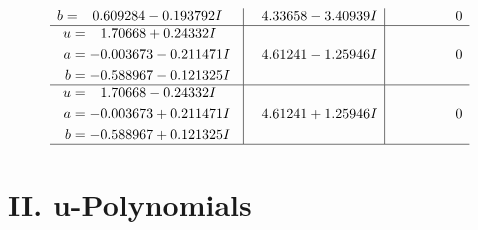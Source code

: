 \documentclass[1p]{elsarticle_modified}
\theoremstyle{definition}
\begin{document}
$$\begin{array}{c|c|c}
\begin{aligned}
b &= \phantom{-}0.609284 - 0.193792 I\end{aligned}
 & \phantom{-}4.33658 - 3.40939 I & \phantom{-0.000000 } 0 \\ \hline\begin{aligned}
u &= \phantom{-}1.70668 + 0.24332 I \\
a &= -0.003673 - 0.211471 I \\
b &= -0.588967 - 0.121325 I\end{aligned}
 & \phantom{-}4.61241 - 1.25946 I & \phantom{-0.000000 } 0 \\ \hline\begin{aligned}
u &= \phantom{-}1.70668 - 0.24332 I \\
a &= -0.003673 + 0.211471 I \\
b &= -0.588967 + 0.121325 I\end{aligned}
 & \phantom{-}4.61241 + 1.25946 I & \phantom{-0.000000 } 0\\
 \hline 
 \end{array}$$\newpage
\newpage\renewcommand{\arraystretch}{1}
\centering \section*{ II. u-Polynomials}
\end{document}
